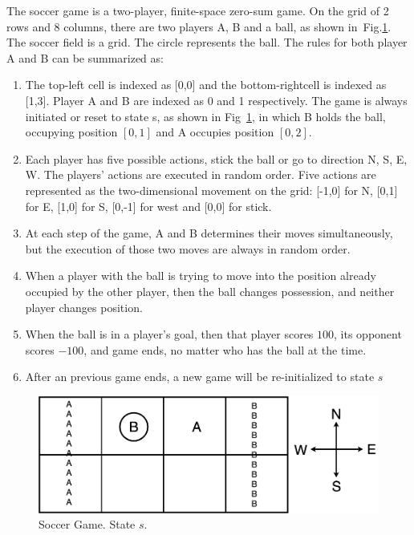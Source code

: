 \documentclass[conference]{IEEEtran}
\begin{document}
The soccer game is a two-player, finite-space zero-sum game. On the grid of 2 rows and 8 columns, there are two players A, B and a ball, as shown in~Fig.\ref{fig:soccer}. The soccer field is a grid. The circle represents the ball. The rules for both player A and B can be summarized as:\par

\begin{enumerate}
  \item The top-left cell is indexed as [0,0] and the bottom-rightcell is indexed as [1,3]. Player A and B are indexed as 0 and 1 respectively. The game is always initiated or reset to state s, as shown in Fig~\ref{fig:soccer}, in which B holds the ball, occupying position $[0,1]$ and A occupies position $[0,2]$.
  \item Each player has five possible actions, stick the ball or go to direction N, S, E, W. The players' actions are executed in random order. Five actions are represented as the two-dimensional movement on the grid: [-1,0] for N, [0,1] for E, [1,0] for S, [0,-1] for west and [0,0] for stick.
  \item At each step of the game, A and B determines their moves simultaneously, but the execution of those two moves are always in random order.
  \item When a player with the ball is trying to move into the position already occupied by the other player, then the ball changes possession, and neither player changes position.
  \item When the ball is in a player's goal, then that player scores $100$, its opponent scores $-100$, and game ends, no matter who has the ball at the time.
  \item After an previous game ends, a new game will be re-initialized to state $s$
\end{enumerate}

\begin{figure}[htbp]
\includegraphics[width=\linewidth]{soccer.png}
\caption{Soccer Game. State $s$.}
\label{fig:soccer}
\end{figure}
\end{document}
